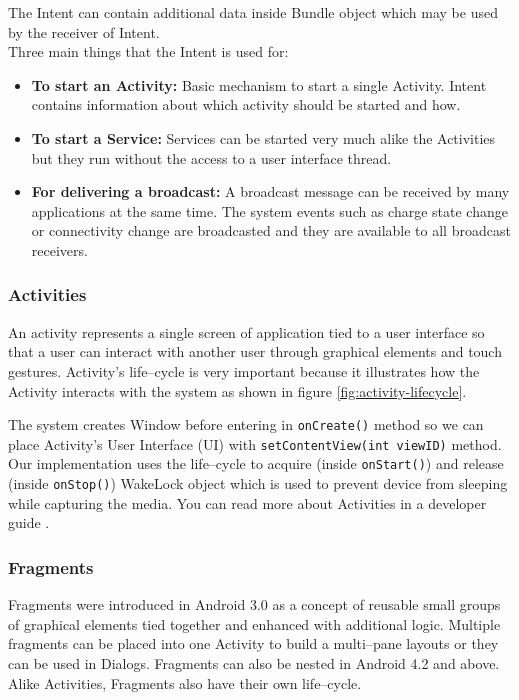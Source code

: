 The Intent can contain additional data inside Bundle object which may be used by the receiver of Intent. \\

\newpage
\noindent
Three main things that the Intent is used for:
\vspace{-0.5em}
\begin{itemize}
	\item \textbf{To start an Activity:} Basic mechanism to start a single Activity. Intent contains information about which activity should be started and how.
	
	\item \textbf{To start a Service:} Services can be started very much alike the Activities but they run without the access to a user interface thread.
	
	\item \textbf{For delivering a broadcast:} A broadcast message can be received by many applications at the same time. The system events such as charge state change or connectivity change are broadcasted and they are available to all broadcast receivers.
\end{itemize}

\subsubsection{Activities}
An activity represents a single screen of application tied to a user interface so that a user can interact with another user through graphical elements and touch gestures. Activity's life--cycle is very important because it illustrates how the Activity interacts with the system as shown in figure \ref{fig:activity-lifecycle}.


The system creates Window before entering in \verb|onCreate()| method so we can place Activity's User Interface (UI) with \verb|setContentView(int viewID)| method. Our implementation uses the life--cycle to acquire (inside \verb|onStart()|) and release (inside \verb|onStop()|) WakeLock object which is used to prevent device from sleeping while capturing the media. You can read more about Activities in a developer guide \cite{activity-lifecycle}.


\subsubsection{Fragments}
Fragments were introduced in Android 3.0 as a concept of reusable small groups of graphical elements tied together and enhanced with additional logic. Multiple fragments can be placed into one Activity to build a multi--pane layouts or they can be used in Dialogs. Fragments can also be nested in Android 4.2 and above. Alike Activities, Fragments also have their own life--cycle.

